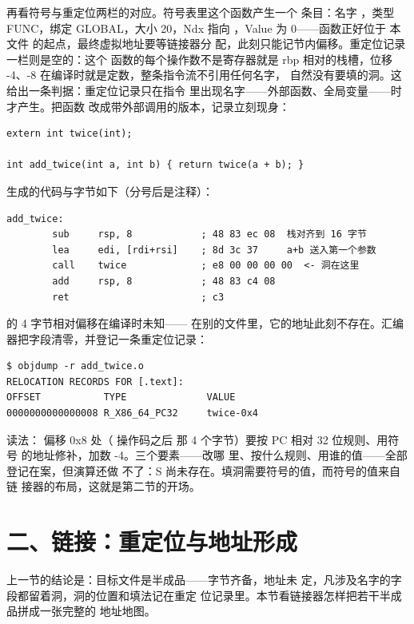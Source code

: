 再看符号与重定位两栏的对应。符号表里这个函数产生一个
条目：名字 ，类型 FUNC，绑定 GLOBAL，大小
20，Ndx 指向 ，Value 为 0——函数正好位于
本文件  的起点，最终虚拟地址要等链接器分
配，此刻只能记节内偏移。重定位记录一栏则是空的：这个
函数的每个操作数不是寄存器就是 rbp 相对的栈槽，位移
-4、-8 在编译时就是定数，整条指令流不引用任何名字，
自然没有要填的洞。这给出一条判据：重定位记录只在指令
里出现名字——外部函数、全局变量——时才产生。把函数
改成带外部调用的版本，记录立刻现身：

\begin{lstlisting}
extern int twice(int);

int add_twice(int a, int b) { return twice(a + b); }
\end{lstlisting}

 生成的代码与字节如下（分号后是注释）：

\begin{lstlisting}
add_twice:
        sub     rsp, 8            ; 48 83 ec 08  栈对齐到 16 字节
        lea     edi, [rdi+rsi]    ; 8d 3c 37     a+b 送入第一个参数
        call    twice             ; e8 00 00 00 00  <- 洞在这里
        add     rsp, 8            ; 48 83 c4 08
        ret                       ; c3
\end{lstlisting}

 的 4 字节相对偏移在编译时未知——
 在别的文件里，它的地址此刻不存在。汇编
器把字段清零，并登记一条重定位记录：

\begin{lstlisting}
$ objdump -r add_twice.o
RELOCATION RECORDS FOR [.text]:
OFFSET           TYPE              VALUE
0000000000000008 R_X86_64_PC32     twice-0x4
\end{lstlisting}

读法： 偏移 0x8 处（ 操作码之后
那 4 个字节）要按 PC 相对 32 位规则、用符号
 的地址修补，加数 -4。三个要素——改哪
里、按什么规则、用谁的值——全部登记在案，但演算还做
不了：S 尚未存在。填洞需要符号的值，而符号的值来自链
接器的布局，这就是第二节的开场。

\section{二、链接：重定位与地址形成}

上一节的结论是：目标文件是半成品——字节齐备，地址未
定，凡涉及名字的字段都留着洞，洞的位置和填法记在重定
位记录里。本节看链接器怎样把若干半成品拼成一张完整的
地址地图。

